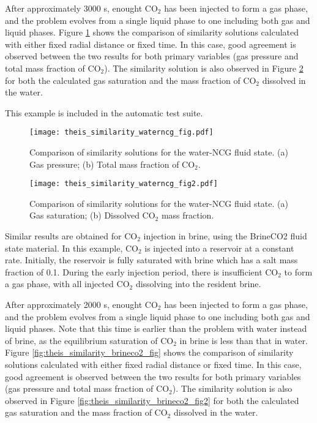 \documentclass[]{report}
\begin{document}
After approximately 3000 s, enought CO$_2$ has been injected to form a gas phase, and the problem
evolves from a single liquid phase to one including both gas and liquid phases. Figure
\ref{fig:theis_similarity_waterncg_fig} shows the comparison of similarity solutions calculated with
either fixed radial distance or fixed time. In this case, good agreement is observed between the two
results for both primary variables (gas pressure and total mass fraction of CO$_2$). The similarity
solution is also observed in Figure \ref{fig:theis_similarity_waterncg_fig2} for both the calculated
gas saturation and the mass fraction of CO$_2$ dissolved in the water.

This example is included in the automatic test suite.

\begin{figure}[htb]
\centering
\texttt{[image: theis\_similarity\_waterncg\_fig.pdf]}
\caption{Comparison of similarity solutions for the water-NCG fluid state.
(a) Gas pressure; (b) Total mass fraction of CO$_2$.}
\label{fig:theis_similarity_waterncg_fig}
\end{figure}

\begin{figure}[htb]
\centering
\texttt{[image: theis\_similarity\_waterncg\_fig2.pdf]}
\caption{Comparison of similarity solutions for the water-NCG fluid state.
(a) Gas saturation; (b) Dissolved CO$_2$ mass fraction.}
\label{fig:theis_similarity_waterncg_fig2}
\end{figure}

Similar results are obtained for CO$_2$ injection in brine, using the BrineCO2 fluid state material.
In this example, CO$_2$ is injected into a reservoir at a constant rate. Initially, the reservoir is
fully saturated with brine which has a salt mass fraction of 0.1. During the early injection period,
there is insufficient CO$_2$ to form a gas phase, with all injected CO$_2$ dissolving into the resident
brine.

After approximately 2000 s, enought CO$_2$ has been injected to form a gas
phase, and the problem evolves from a single liquid phase to one including both
gas and liquid phases. Note that this time is earlier than the problem with
water instead of brine, as the equilibrium saturation of CO$_2$ in  brine is
less than that in water. Figure \ref{fig:theis_similarity_brineco2_fig} shows
the comparison of similarity solutions calculated with either fixed radial
distance or fixed time. In this case, good agreement is observed between the two
results for both primary variables (gas pressure and total mass fraction of
CO$_2$). The similarity solution is also observed in Figure
\ref{fig:theis_similarity_brineco2_fig2} for both the calculated gas saturation
and the mass fraction of CO$_2$ dissolved in the water.
\end{document}
